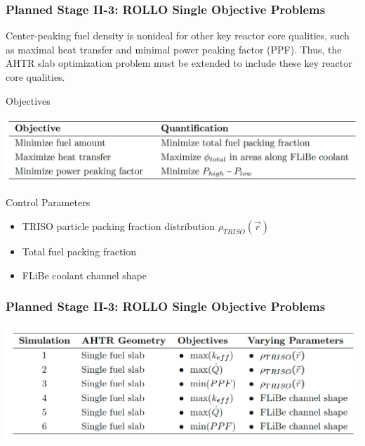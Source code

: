 \begin{frame}
    \frametitle{Planned Stage II-3: ROLLO Single Objective Problems}
    Center-peaking fuel density is nonideal for other key reactor core 
        qualities, such as maximal heat transfer and minimal power peaking factor (PPF).
        Thus, the AHTR slab optimization problem must be extended to include 
        these key reactor core qualities. 
    \begin{block}{Objectives}
        \vspace{-0.2cm}
    \begin{table}
        \caption{ROLLO optimization problem objectives with their quantification 
        descriptions.}
        \includegraphics[width=0.7\linewidth]{figures/opt-obj.png}
    \end{table}
\end{block}
\vspace{-0.5cm}
\begin{block}{Control Parameters}
    \begin{itemize}
        \item TRISO particle packing fraction distribution $\rho_{TRISO}(\vec{r})$
        \item Total fuel packing fraction
        \item FLiBe coolant channel shape 
    \end{itemize}
\end{block}
\end{frame}

\begin{frame}
    \frametitle{Planned Stage II-3: ROLLO Single Objective Problems}
    \begin{table}
        \caption{Proposed ROLLO simulations for AHTR fuel assembly single 
        objective optimization.
        PF: Total Fuel Packing Fraction, $\dot{Q}$: Heat transfer, $PPF$: Power Peaking Factor, 
        $\rho_{TRISO}(\vec{r})$: \gls{TRISO} particle distribution}
        \includegraphics[width=0.8\linewidth]{figures/single-obj.png}
    \end{table}
\end{frame}
